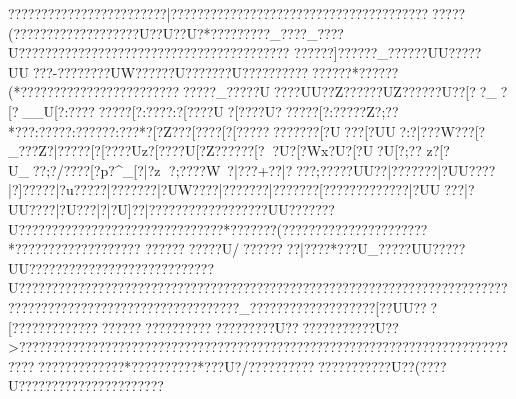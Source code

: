 {{{{{{{{{{{{{{{{{{{{{{{{{{{{{{{{{{{{{{{{{{{{{{{{{{{{{{{{{{{{{{{{{{{{{{{{{{{{{{{{{{{{{{{{{{{{{{{{{{{{{{{{{{{{{{{{{{{{{{{{{{{{{{{{{{{{{{{{{{{{{{{{{{{{{{{{{{{{{{{{{{{{{{{{{{{{{{{{{{{{{{{{{{{{{{{{{{{{{{{{{{{{{{{{{{{{{{{{{{{{{{{{{{{{{{{{{{{{{{{{{{{{{{{{{{{{{{{{{{{{{{{{{{{{{{{{{{{{{{{{{{{{{{{{{{{{{{{{{{{{{{{{{{{{{{{{{{{{{{{{{{{{{{{{{{{{{{{{{{{{{{{{{{{{{{{{{{{{{{{{{{{{{{{{{{{{{{{{{{{{{{{{{{{{{{{{{{{{{{{{{{{{{{{{{{{{{{{{{{{{{{{{{{{{{{{{{{{{{{{{{{{{{{{{{{{{{{{{{{{{{{{{{{{{{{{{{{{{{{{{{{{{{{{{{{{{{{{{{{{{{{{{{{{{{{{{{{{{{{{{{{{{{{{{{{{{{{{{{{{{{{{{{{{{{{{{{{{{{{{{{{{{{{{{{{{{{{{{{{{{{{{{{{{{{{{{{{{{{{{{{{{{{{{{{{{{{{{{{{{{{{{{{{{{{{{{{{{{{{{{{{{{{{{{{{{{{{{{{{{{{{{{{{{{{{{{{{{{{{{{{{{{{{{{{{{{{{{{{{{{{{{{{{{{{{{{{{{{{{{{{{{{{{{{{{{{{{{{{{{{{{{{{{{{{{{{{{{{{{{{{{{{{{{{{{{{{{{{{{{{{{{{{{{{{{{{{{{{{{{{{{{{{{{{{{{{{{{{{{{{{{{{{{{{{{{{{{{{{{{{{{{{{{{{{{{{{{{{{{{{{{{{{{{{{{{{{{{{{{{{{{{{{{{{{{{{{{{{{{{{{{{{{{{{{{{{{{{{{{{{{{{{{{{{{{{{{{{{{{{{{{{{{{{{{{{{{{{{{{{{{{{{{{{{{{{{{{{{{{{{{{{{{{{{{{{{{{{{{{{{{{{{{{{{{{{{{{{{{{{{{{{{{{{{{{{{{{{{??{???????????????{???????|????????????????????????????????????????????( ????  ???????????????U??U??U?*????? ????_?? ??_?? ??U????????????????????????????????????????? ??????]??????_??????UU?????UU???-????????UW??????U???????U????  ?????? ?????? *??????(*????????{????????????????????{?_????{?U???{?UU??Z??????UZ??????U??[??_{?[?__U[?:???{??????[?:????:?[????U?[????U{??????[?:?????Z?;??*??{?:????{?:?????{?:???*?[?Z???  [?{?  ??[?[????????????[?U???[?UU?:?|???W???[?_???Z?|?????[?[????Uz?[????U[?Z???? ??[??U{?[?Wx?U{?[?U?U[?;??  z?[?U_?{?;?/???{?[?p?^_[?|?z ?;????W~?|??? +??|????;?????UU??|???????|?UU????|?]?????|?u?????|???????|?UW????|???????|???????[???????\???????|?UU???|?UU????|?U???|?|?U]??|?????????}???  ??????UU???????U???????????????????????????????*???????(??????? ???????????????*??????? ????????????
 ???????????U/??????  ??|????*???U_?????UU?????UU??????  ??????????????????????U?????????????????????????????????????????????????????????????????????????????????  ?????   ???????????????????????_{???????{???????{?????[??UU???[???????{?????{??????{????????????????????U?????? ???????U??>???? ???????????????????????????????????????????????????????????????????????????????????????*????? ????? *???U?/?????  ????? ???????????U??(????U???????}???????????????
}}}}}}}}}}}}}}}}}}}}}}}}}}}}}}}}}}}}}}}}}}}}}}}}}}}}}}}}}}}}}}}}}}}}}}}}}}}}}}}}}}}}}}}}}}}}}}}}}}}}}}}}}}}}}}}}}}}}}}}}}}}}}}}}}}}}}}}}}}}}}}}}}}}}}}}}}}}}}}}}}}}}}}}}}}}}}}}}}}}}}}}}}}}}}}}}}}}}}}}}}}}}}}}}}}}}}}}}}}}}}}}}}}}}}}}}}}}}}}}}}}}}}}}}}}}}}}}}}}}}}}}}}}}}}}}}}}}}}}}}}}}}}}}}}}}}}}}}}}}}}}}}}}}}}}}}}}}}}}}}}}}}}}}}}}}}}}}}}}}}}}}}}}}}}}}}}}}}}}}}}}}}}}}}}}}}}}}}}}}}}}}}}}}}}}}}}}}}}}}}}}}}}}}}}}}}}}}}}}}}}}}}}}}}}}}}}}}}}}}}}}}}}}}}}}}}}}}}}}}}}}}}}}}}}}}}}}}}}}}}}}}}}}}}}}}}}}}}}}}}}}}}}}}}}}}}}}}}}}}}}}}}}}}}}}}}}}}}}}}}}}}}}}}}}}}}}}}}}}}}}}}}}}}}}}}}}}}}}}}}}}}}}}}}}}}}}}}}}}}}}}}}}}}}}}}}}}}}}}}}}}}}}}}}}}}}}}}}}}}}}}}}}}}}}}}}}}}}}}}}}}}}}}}}}}}}}}}}}}}}}}}}}}}}}}}}}}}}}}}}}}}}}}}}}}}}}}}}}}}}}}}}}}}}}}}}}}}}}}}}}}}}}}}}}}}}}}}}}}}}}}}}}}}}}}}}}}}}}}}}}}}}}}}}}}}}}}}}}}}}}}}}}}}}}}}}}}}}}}}}}}}}}}}}}}}}}}}}}}}}}}}}}}}}}}}}}}}}}}}}}}}}}}}}}}}}}}}}}}}}}}}}}}}}}}}}}}}}}}}}}}}}}}}}}}}}}}}}}}}}}}}}}}}}}}}}}}}}}}}}}}}}}}}}}}}}}}}}}}}}}}}}}}}}}}}}}}}}}}}}}}}}}}}}}}}}}}}}}}}}}}}}}}}}}}}}}}}}}}}}}}}}}}}}}}}}}}}}}}}}}}}}}}}}}}}}}}}}}
